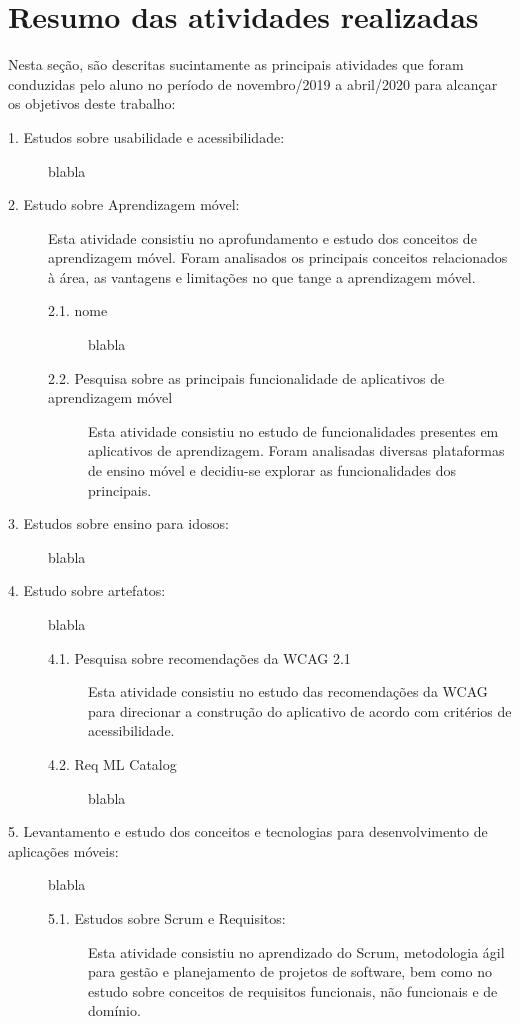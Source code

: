 \chapter{Resumo das atividades realizadas} \label{sec:resumo_ativ}
Nesta seção, são descritas sucintamente as principais atividades que foram conduzidas pelo aluno no período de novembro/2019 a abril/2020 para alcançar os objetivos deste trabalho:

\begin{description}
\item[1. Estudos sobre usabilidade e acessibilidade:]
blabla

\item[2. Estudo sobre Aprendizagem móvel:] Esta atividade consistiu no aprofundamento e estudo dos conceitos de aprendizagem móvel. Foram analisados os principais conceitos relacionados à área, as vantagens e limitações no que tange a aprendizagem móvel. 

\begin{description}
    \item[2.1. nome]
    blabla
    
    \item[2.2. Pesquisa sobre as principais funcionalidade de aplicativos de aprendizagem móvel]
    Esta atividade consistiu no estudo de funcionalidades presentes em aplicativos de aprendizagem. Foram analisadas diversas plataformas de ensino móvel e decidiu-se explorar as funcionalidades dos principais.
\end{description}

\item[3. Estudos sobre ensino para idosos:]
blabla

\item[4. Estudo sobre artefatos:]
blabla

\begin{description}
    \item[4.1. Pesquisa sobre recomendações da WCAG 2.1]
    Esta atividade consistiu no estudo das recomendações da WCAG para direcionar a construção do aplicativo de acordo com critérios de acessibilidade.
    
    \item[4.2. Req ML Catalog]
    blabla
\end{description}


\item[5. Levantamento e estudo dos conceitos e tecnologias para desenvolvimento de aplicações móveis:]
 blabla

\begin{description}
\item[5.1. Estudos sobre Scrum e Requisitos:] Esta atividade consistiu no aprendizado do Scrum, metodologia ágil para gestão e planejamento de projetos de software, bem como no estudo sobre conceitos de requisitos funcionais, não funcionais e de domínio.


\end{description}
\end{description}
